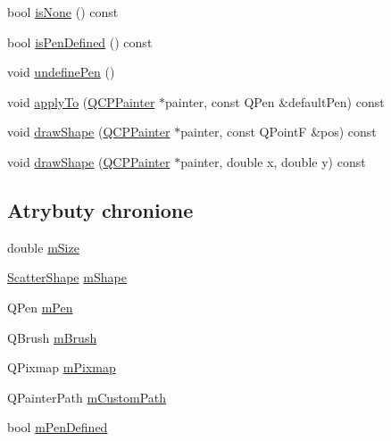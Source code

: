 \begin{DoxyCompactItemize}
\item 
bool \hyperlink{class_q_c_p_scatter_style_aa3861281108d0adbeb291c820ea3925c}{is\+None} () const 
\item 
bool \hyperlink{class_q_c_p_scatter_style_a7f1385a8d5e4f349a6b8030723fbd0f7}{is\+Pen\+Defined} () const 
\item 
void \hyperlink{class_q_c_p_scatter_style_acabc2a8c83d650b946f50c3166b6c35e}{undefine\+Pen} ()
\item 
void \hyperlink{class_q_c_p_scatter_style_a81817dfd404635f211e6ff2a04657d36}{apply\+To} (\hyperlink{class_q_c_p_painter}{Q\+C\+P\+Painter} $\ast$painter, const Q\+Pen \&default\+Pen) const 
\item 
void \hyperlink{class_q_c_p_scatter_style_aeaf6dbadb0b0e6d890a6e3bbe5aebece}{draw\+Shape} (\hyperlink{class_q_c_p_painter}{Q\+C\+P\+Painter} $\ast$painter, const Q\+PointF \&pos) const 
\item 
void \hyperlink{class_q_c_p_scatter_style_ae76811ac9f70ebf7a2b4c759853e6ed8}{draw\+Shape} (\hyperlink{class_q_c_p_painter}{Q\+C\+P\+Painter} $\ast$painter, double x, double y) const 
\end{DoxyCompactItemize}
\subsection*{Atrybuty chronione}
\begin{DoxyCompactItemize}
\item 
double \hyperlink{class_q_c_p_scatter_style_a757da98671eb06b221979373ac2cec91}{m\+Size}
\item 
\hyperlink{class_q_c_p_scatter_style_adb31525af6b680e6f1b7472e43859349}{Scatter\+Shape} \hyperlink{class_q_c_p_scatter_style_af1b327f35f107ed108290187bbc8c7c6}{m\+Shape}
\item 
Q\+Pen \hyperlink{class_q_c_p_scatter_style_a0f6a85e6d1e3ae1ca1b6efb4d4cdfe17}{m\+Pen}
\item 
Q\+Brush \hyperlink{class_q_c_p_scatter_style_a1b9c6ab10aebcaf236f1f45d1d6d64d1}{m\+Brush}
\item 
Q\+Pixmap \hyperlink{class_q_c_p_scatter_style_a7697346c89b19d4cd1d8dd33319ec9e3}{m\+Pixmap}
\item 
Q\+Painter\+Path \hyperlink{class_q_c_p_scatter_style_a813cb074744dc5a2f59cc99d6a10c6f0}{m\+Custom\+Path}
\item 
bool \hyperlink{class_q_c_p_scatter_style_a84ef5aa591ddba07b440f597e1669e78}{m\+Pen\+Defined}
\end{DoxyCompactItemize}


